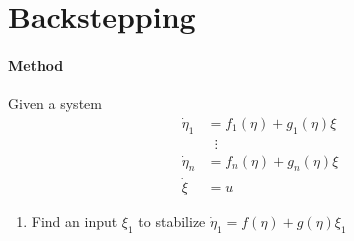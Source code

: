 \section{Backstepping}

\paragraph{Method}
Given a system
\begin{align}
	\dot{\eta}_1 &= f_1(\eta) + g_1(\eta)\xi \\
	             &\hspace{7pt}\vdots         \\
	\dot{\eta}_n &= f_n(\eta) + g_n(\eta)\xi \\
	\dot{\xi}    &= u
\end{align}

\begin{enumerate}
	\item Find an input $\xi_1$ to stabilize $\dot{\eta}_1 = f(\eta) + g(\eta)\xi_1$
\end{enumerate}